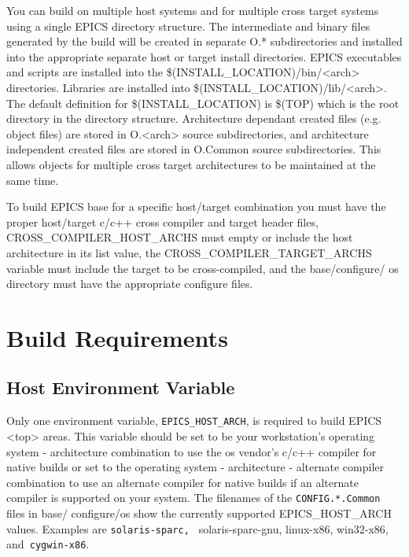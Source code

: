 You can build on multiple host systems and for multiple cross target systems using a single EPICS directory structure. 
The intermediate and binary files generated by the build will be created in separate O.* subdirectories and installed into 
the appropriate separate host or target install directories. EPICS executables and scripts are installed into the 
\$(INSTALL\_LOCATION)/bin/\textless{}arch\textgreater{} directories. Libraries are installed into \$(INSTALL\_LOCATION)/lib/\textless{}arch\textgreater{}. The 
default definition for \$(INSTALL\_LOCATION) is \$(TOP) which is the root directory in the directory structure. 
Architecture dependant created files (e.g. object files) are stored in O.\textless{}arch\textgreater{} source subdirectories, and architecture 
independent created files are stored in O.Common source subdirectories. This allows objects for multiple cross target 
architectures to be maintained at the same time. 

To build EPICS base for a specific host/target combination you must have the proper host/target c/c++ cross compiler and 
target header files, CROSS\_COMPILER\_HOST\_ARCHS must empty or include the host architecture in its list value, the 
CROSS\_COMPILER\_TARGET\_ARCHS variable must include the target to be cross-compiled, and the base/configure/
os directory must have the appropriate configure files.

\section{Build Requirements}

\subsection{Host Environment Variable}

Only one environment variable, \verb|EPICS_HOST_ARCH|, is required to build EPICS \textless{}top\textgreater{} areas. This variable should be 
set to be your workstation's operating system - architecture combination to use the os vendor's c/c++ compiler for native 
builds or set to the operating system - architecture - alternate compiler combination to use an alternate compiler for native 
builds if an alternate compiler is supported on your system. The filenames of the \verb|CONFIG.*.Common |files in base/
configure/os show the currently supported EPICS\_HOST\_ARCH values. Examples are \verb|solaris-sparc, |
solaris-sparc-gnu, linux-x86, win32-x86, and\verb| cygwin-x86|. 

